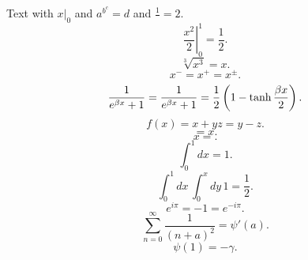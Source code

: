 \documentclass{article}
\newcommand{\foo}[2][x]{#1+#2}
\def\bar#1#2{#1-#2}
\begin{document}
Text with $\left. x \right|_{0}$ and $a^{b^{c}} = d$ and $\frac{1}{} = 2$.
\begin{equation}
\left.\frac{x^2}{2}\right|_0^1 = \frac{1}{2} .
\label{eq:k1}
\end{equation}
\begin{equation}
\sqrt[3]{x^3} = x .
\label{eq:k2}
\end{equation}
\begin{equation}
x^{-} = x^{+} = x^{\pm} .
\label{eq:k3}
\end{equation}
\begin{equation}
\frac{1}{e^{\beta x}+1} = {1 \over e^{\beta x}+1} = \frac12\left(1-\tanh\frac{\beta x}2\right) .
\label{eq:k4}
\end{equation}
\begin{equation}
f(x) = \foo{y}{z} = \bar{y}{z} .
\label{eq:k5}
\end{equation}
\begin{equation}
= x .
\label{eq:k6}
\end{equation}
\begin{equation}
x = .
\label{eq:k7}
\end{equation}
\begin{equation}
\int_0^1 dx = 1 .
\label{eq:k8}
\end{equation}
\begin{equation}
\int_0^{1} dx\, \int_0^{x} dy\, 1 = \frac{1}{2} .
\label{eq:k9}
\end{equation}
\begin{equation}
e^{i\pi} = -1 = e^{-i\pi} .
\label{eq:k10}
\end{equation}
\begin{equation}
\sum_{n=0}^{\infty} \frac{1}{(n+a)^2} = \psi'(a) .
\label{eq:k11}
\end{equation}
\begin{equation}
\psi(1) = -\gamma .
\label{eq:k12}
\end{equation}
\end{document}

